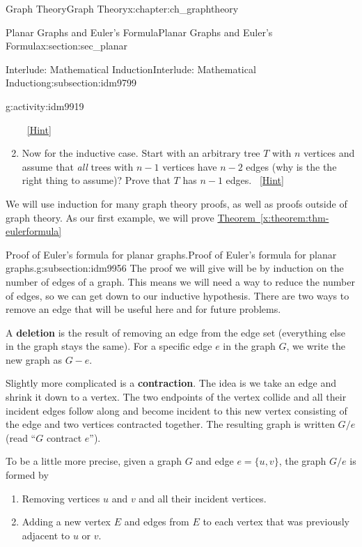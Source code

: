 \documentclass[oneside,10pt,]{book}
\newcommand{\terminology}[1]{\textbf{#1}}
\numberwithin{equation}{chapter}
\begin{document}
\begin{chapterptx}{Graph Theory}{}{Graph Theory}{}{}{x:chapter:ch_graphtheory}
\begin{sectionptx}{Planar Graphs and Euler's Formula}{}{Planar Graphs and Euler's Formula}{}{}{x:section:sec_planar}
\begin{subsectionptx}{Interlude: Mathematical Induction}{}{Interlude: Mathematical Induction}{}{}{g:subsection:idm9799}
\begin{activity}{}{g:activity:idm9919}
\begin{enumerate}[font=\bfseries,label=(\alph*),ref=\alph*]
\qquad~\hfill{\tiny\hyperlink{g:hint:idm9936-back}{[Hint]}}\item{}Now for the inductive case.  Start with an arbitrary tree \(T\) with \(n\) vertices and assume that \emph{all} trees with \(n-1\) vertices have \(n-2\) edges (why is the the right thing to assume)?  Prove that \(T\) has \(n-1\) edges.%
\qquad~\hfill{\tiny\hyperlink{g:hint:idm9949-back}{[Hint]}}\end{enumerate}
\end{activity}
We will use induction for many graph theory proofs, as well as proofs outside of graph theory.  As our first example, we will prove \hyperref[x:theorem:thm-eulerformula]{Theorem~\ref{x:theorem:thm-eulerformula}}%
\end{subsectionptx}
%
%
\typeout{************************************************}
\typeout{************************************************}
%
\begin{subsectionptx}{Proof of Euler's formula for planar graphs.}{}{Proof of Euler's formula for planar graphs.}{}{}{g:subsection:idm9956}
The proof we will give will be by induction on the number of edges of a graph.  This means we will need a way to reduce the number of edges, so we can get down to our inductive hypothesis.  There are two ways to remove an edge that will be useful here and for future problems.%
\par
{} A \terminology{deletion} is the result of removing an edge from the edge set (everything else in the graph stays the same).  For a specific edge \(e\) in the graph \(G\), we write the new graph as \(G - e\).%
\par
{} Slightly more complicated is a \terminology{contraction}.  The idea is we take an edge and shrink it down to a vertex.  The two endpoints of the vertex collide and all their incident edges follow along and become incident to this new vertex consisting of the edge and two vertices contracted together.  The resulting graph is written \(G/e\) (read ``\(G\) contract \(e\)'').%
\par
To be a little more precise, given a graph \(G\) and edge \(e = \{u,v\}\), the graph \(G/e\) is formed by%
\begin{enumerate}
\item{}Removing vertices \(u\) and \(v\) and all their incident vertices.%
\item{}Adding a new vertex \(E\) and edges from \(E\) to each vertex that was previously adjacent to \(u\) or \(v\).%

\end{enumerate}
\end{subsectionptx}
\end{sectionptx}
\end{chapterptx}
\end{document}
